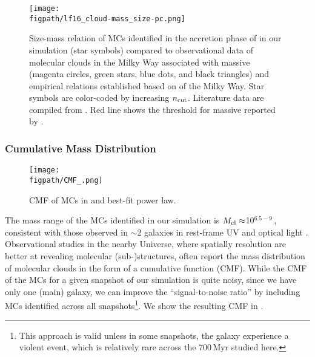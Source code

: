 \IfFileExists{emulateapjlegacy.cls}{\documentclass[iop]{emulateapjlegacy}}{\documentclass[iop]{emulateapj}}
\begin{document}
\begin{figure*}[htbp]
\centering
\texttt{[image: \\figpath/lf16\_cloud-mass\_size-pc.png]}
\caption{
Size-mass relation of MCs identified in the accretion phase of \flower in our simulation (star symbols) 
compared to observational data of molecular clouds in the Milky Way associated with massive \SF 
(magenta circles, green stars, blue dots, and black triangles) and empirical relations 
established based on \obs of the Milky Way.
Star symbols are color-coded by increasing $n_{\rm cut}$.
Literature data are compiled from \citet{Beuther02a, Mueller02a, Hill05a, Motte07a}.
Red line shows the threshold for massive \SF reported by \citet{Kauffmann10b}.
\label{fig:MR}}
\end{figure*}

\subsubsection{Cumulative Mass Distribution}   \label{sec:cmf}

\begin{figure}[htbp]
\centering
\texttt{[image: \\figpath/CMF\_.png]}
\caption{
CMF of MCs in \flower and best-fit power law.
\label{fig:cmf}}
\end{figure}

The mass range of the MCs identified in our simulation is $M_{\rm cl}\approx$10$^{6.5-9}$\,\Msun,
consistent with those observed in \z$\sim$2 galaxies in
rest-frame UV and optical light \citep{Elmegreen07a, Elmegreen09a}.
Observational studies in the nearby Universe, where 
spatially resolution are better at revealing molecular (sub-)structures,
often report the mass distribution of molecular clouds in the form of a cumulative function (CMF).
While the CMF of the MCs for a given snapshot of our simulation is 
quite noisy, since we have only one (main) galaxy, 
we can improve the ``signal-to-noise ratio'' by including 
MCs identified across all snapshots\footnote{This approach is valid unless in some snapshots,
the galaxy experience a violent event, which is relatively rare across the 700\,Myr studied here.}.
We show the resulting CMF in .
\end{document}
